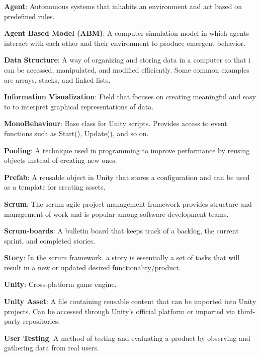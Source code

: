 
\noindent
\label{itm:agent}\textbf{Agent}: Autonomous systems that inhabits an environment and act based on predefined rules.

\noindent
\label{itm:abm}\textbf{Agent Based Model (ABM)}: A computer simulation model in which agents interact with each other and their environment to produce emergent behavior. 

\noindent
\label{itm:data-structure}\textbf{Data Structure}: A way of organizing and storing data in a computer so that i can be accessed, manipulated, and modified efficiently. Some common examples are arrays, stacks, and linked lists. 

\noindent
\label{itm:information-visualization}\textbf{Information Visualization}: Field that focuses on creating meaningful and easy to to interpret graphical representations of data.

\noindent
\label{itm:monobehaviour}\textbf{MonoBehaviour}: Base class for Unity scripts. Provides access to event functions such as Start(), Update(), and so on.

\noindent
\label{itm:pooling}\textbf{Pooling}: A technique used in programming to improve performance by reusing objects instead of creating new ones. 

\noindent
\label{itm:prefab}\textbf{Prefab}: A reusable object in Unity that stores a configuration and can be used as a template for creating assets.

\noindent
\label{itm:scrum}\textbf{Scrum}: The scrum agile project management framework provides structure and management of work and is popular among software development teams.

\noindent 
\label{itm:scrum-boards}\textbf{Scrum-boards}: A bulletin board that keeps track of a backlog, the current sprint, and completed stories.

\noindent
\label{itm:story}\textbf{Story}: In the scrum framework, a story is essentially a set of tasks that will result in a new or updated desired functionality/product.  

\noindent
\label{itm:unity}\textbf{Unity}: Cross-platform game engine.

\noindent
\label{itm:unity-asset}\textbf{Unity Asset}: A file  containing reusable content that can be imported into Unity projects. Can be accessed through Unity's official platform or imported via third-party repositories. 

\noindent
\label{itm:user-testing}\textbf{User Testing}: A method of testing and evaluating a product by observing and gathering data from real users. 

